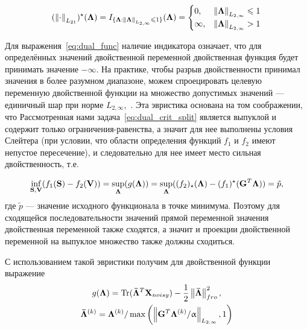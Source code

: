 \begin{equation}
    (\left\lVert\cdot\right\rVert_{L_{21}})^{\star}(\mathbf{\Lambda}) = I_{\{\mathbf{\Lambda} : \left\lVert\mathbf{\Lambda}\right\rVert_{L_{2,\infty}} \leqslant 1\}}(\mathbf{\Lambda})=
    \begin{cases}
        0, & \left\lVert\mathbf{\Lambda}\right\rVert_{L_{2,\infty}} \leqslant 1\\
        \infty, & \left\lVert\mathbf{\Lambda}\right\rVert_{L_{2,\infty}} > 1
    \end{cases}
\end{equation}

Для выражения~\ref{eq:dual_func} наличие индикатора означает, что для
определённых значений двойственной переменной двойственная функция будет
принимать значение $-\infty$.  На практике, чтобы разрыв двойственности
принимал значения в более разумном диапазоне, можем спроецировать целевую
переменную двойственной функции на множество допустимых значений --- единичный
шар при норме $L_{2,\infty}$,~\cite{Gramfort2012, Gramfort2014}.  Эта
эвристика основана на том соображении, что Рассмотренная нами
задача~\ref{eq:dual_crit_split} является выпуклой и содержит только
ограничения-равенства, а значит для нее выполнены условия Слейтера (при
условии, что области определения функций $f_1$ и $f_2$ имеют непустое
пересечение), и следовательно для нее имеет место сильная двойственность, т.е. 

\begin{equation}
    \inf_{\mathbf{S}, \mathbf{V}}(f_1(\mathbf{S}) - f_2(\mathbf{V})) = \sup_{\mathbf{\Lambda}}(g(\mathbf{\Lambda})) =
    \sup_{\mathbf{\Lambda}}((f_2)_{\star}(\mathbf{\Lambda}) - (f_1)^{\star}(\mathbf{G}^T\mathbf{\Lambda})) = \tilde{p},
\end{equation}
где $\tilde{p}$ --- значение исходного функционала в точке минимума.
Поэтому для сходящейся последовательности
значений прямой переменной значения двойственная переменной также сходятся,
а значит и проекции двойственной переменной на выпуклое множество также должны сходиться.

С использованием такой эвристики получим для двойственной функции выражение
\begin{gather}
    g(\mathbf{\Lambda}) =
    \operatorname*{Tr}(\mathbf{\bar{\Lambda}}^T\mathbf{X}_{noisy}) - \frac{1}{2}\left\lVert\mathbf{\bar{\Lambda}}\right\rVert^2_{fro},\\
    \mathbf{\bar{\Lambda}}^{(k)} = \mathbf{\Lambda}^{(k)} / \max\left(\left\lVert\mathbf{G}^T\mathbf{\Lambda}^{(k)}/\upalpha\right\rVert_{L_{2,\infty}}, 1\right)
    \label{eq:projection_of_dual_var}
\end{gather}

